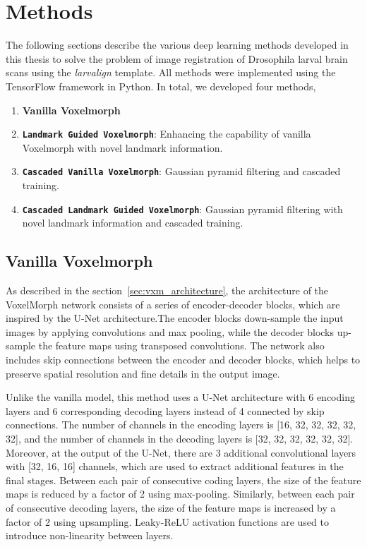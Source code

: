 \documentclass{book}
\begin{document}
	\chapter{Methods}\label{chap:methods}
	
	The following sections describe the various deep learning methods developed in this thesis to solve the problem of image registration of Drosophila larval brain scans using the \textit{larvalign} template. All methods were implemented using the TensorFlow framework in Python. In total, we developed four methods,
	\begin{enumerate}
		\item \textbf{Vanilla Voxelmorph}
		\item \textbf{\texttt{Landmark Guided Voxelmorph}}: Enhancing the capability of vanilla Voxelmorph with novel landmark information.
		\item \textbf{\texttt{Cascaded Vanilla Voxelmorph}}: Gaussian pyramid filtering and cascaded training.
		\item \textbf{\texttt{Cascaded Landmark Guided Voxelmorph}}: Gaussian pyramid filtering with novel landmark information and cascaded training.
	\end{enumerate}

	\section{Vanilla Voxelmorph}\label{sec:method1}
	
	As described in the section~\ref{sec:vxm_architecture}, the architecture of the VoxelMorph network consists of a series of encoder-decoder blocks, which are inspired by the U-Net architecture.The encoder blocks down-sample the input images by applying convolutions and max pooling, while the decoder blocks up-sample the feature maps using transposed convolutions. The network also includes skip connections between the encoder and decoder blocks, which helps to preserve spatial resolution and fine details in the output image.
	
	Unlike the vanilla model, this method uses a U-Net architecture with 6 encoding layers and 6 corresponding decoding layers instead of 4 connected by skip connections. The number of channels in the encoding layers is [16, 32, 32, 32, 32, 32], and the number of channels in the decoding layers is [32, 32, 32, 32, 32, 32]. Moreover, at the output of the U-Net, there are 3 additional convolutional layers with [32, 16, 16] channels, which are used to extract additional features in the final stages. Between each pair of consecutive coding layers, the size of the feature maps is reduced by a factor of 2 using max-pooling. Similarly, between each pair of consecutive decoding layers, the size of the feature maps is increased by a factor of 2 using upsampling. Leaky-ReLU activation functions are used to introduce non-linearity between layers.
	
\end{document}
